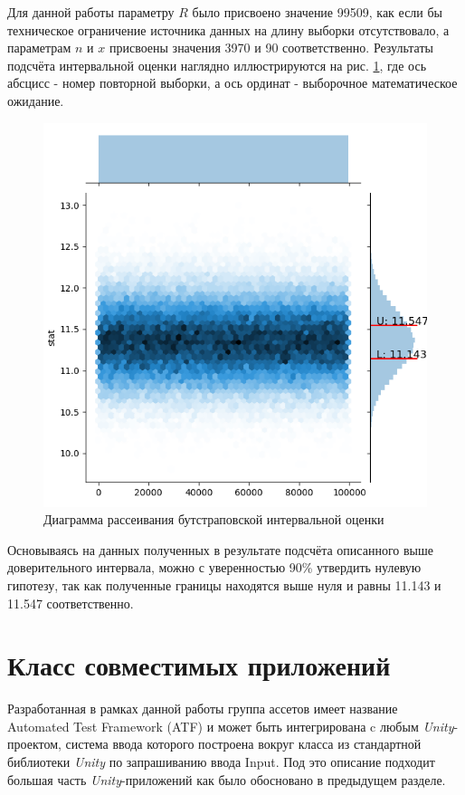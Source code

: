 Для данной работы параметру $R$ было присвоено значение 99509, как если бы техническое ограничение источника данных на длину выборки отсутствовало, а параметрам $n$ и $x$ присвоены значения 3970 и 90 соответственно. Результаты подсчёта интервальной оценки наглядно иллюстрируются на рис. \ref{experiment}, где ось абсцисс - номер повторной выборки, а ось ординат - выборочное математическое ожидание.

\begin{figure}[H]
	\centering
	\includegraphics[width=\linewidth]{experiment.png}
	\caption{Диаграмма рассеивания бутстраповской интервальной оценки}
	\label{experiment}
\end{figure}

Основываясь на данных полученных в результате подсчёта описанного выше доверительного интервала, можно с уверенностью 90\% утвердить нулевую гипотезу, так как полученные границы находятся выше нуля и равны 11.143 и 11.547 соответственно.

\section{Класс совместимых приложений}
Разработанная в рамках данной работы группа ассетов имеет название Automated Test Framework (ATF) и может быть интегрирована c любым  \textit{Unity}-проектом, система ввода которого построена вокруг класса из стандартной библиотеки \textit{Unity} по запрашиванию ввода Input. Под это описание подходит большая часть \textit{Unity}-приложений как было обосновано в предыдущем разделе.

